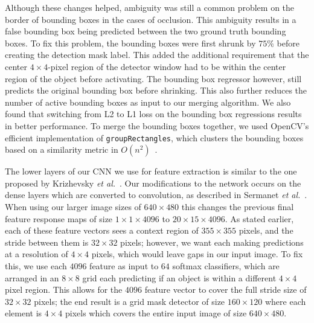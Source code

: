 \documentclass[journal]{IEEEtran}
\begin{document}
Although these changes helped, ambiguity was still a common problem on the border of bounding boxes in the cases of occlusion. This ambiguity results in a false bounding box being predicted between the two ground truth bounding boxes. To fix this problem, the bounding boxes were first shrunk by $75\%$ before creating the detection mask label. This added the additional requirement that the center $4 \times 4$-pixel region of the detector window had to be within the center region of the object before activating. The bounding box regressor however, still predicts the original bounding box before shrinking. This also further reduces the number of active bounding boxes as input to our merging algorithm. We also found that switching from L2 to L1 loss on the bounding box regressions results in better performance. To merge the bounding boxes together, we used OpenCV's efficient implementation of \texttt{groupRectangles}, which clusters the bounding boxes based on a similarity metric in $O(n^2)$~\cite{opencv}. 

The lower layers of our CNN we use for feature extraction is similar to the one proposed by Krizhevsky \textit{et al.}~\cite{krizhevsky-2012}. Our modifications to the network occurs on the dense layers which are converted to convolution, as described in Sermanet \textit{et al.}~\cite{sermanet-2013}. When using our larger image sizes of $640 \times 480$ this changes the previous final feature response maps of size $1\times 1\times 4096$ to $20 \times 15 \times 4096$. As stated earlier, each of these feature vectors sees a context region of $355 \times 355$ pixels, and the stride between them is $32 \times 32$ pixels; however, we want each making predictions at a resolution of $4 \times 4$ pixels, which would leave gaps in our input image. To fix this, we use each $4096$ feature as input to $64$ softmax classifiers, which are arranged in an $8 \times 8$ grid each predicting if an object is within a different $4 \times 4$ pixel region. This allows for the $4096$ feature vector to cover the full stride size of $32 \times 32$ pixels; the end result is a grid mask detector of size $160 \times 120$ where each element is $4 \times 4$ pixels which covers the entire input image of size $640 \times 480$. 
\end{document}
